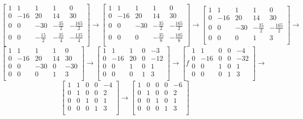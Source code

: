 \documentclass[a4paper]{article}
\begin{document}
\[
\left[
\begin{array}{cccc|c}
	1 & 1 & 1 & 1 & 0 \\ 
	0 & -16 & 20 & 14 & 30 \\ 
	0 & 0 & -30 & -\frac{35}{2} & -\frac{165}{2} \\		
	0 & 0 & -\frac{15}{2} & -\frac{35}{4} & -\frac{135}{4} \\	
\end{array}
\right]
\to
\left[
\begin{array}{cccc|c}
	1 & 1 & 1 & 1 & 0 \\ 
	0 & -16 & 20 & 14 & 30 \\ 
	0 & 0 & -30 & -\frac{35}{2} & -\frac{165}{2} \\		
	0 & 0 & 0 & -\frac{35}{8} & -\frac{105}{8} \\		
\end{array}
\right]
\to
\left[
\begin{array}{cccc|c}
	1 & 1 & 1 & 1 & 0 \\ 
	0 & -16 & 20 & 14 & 30 \\ 
	0 & 0 & -30 & -\frac{35}{2} & -\frac{165}{2} \\		
	0 & 0 & 0 & 1 & 3 \\		
\end{array}
\right]
\to\]
\[
\left[
\begin{array}{cccc|c}
	1 & 1 & 1 & 1 & 0 \\ 
	0 & -16 & 20 & 14 & 30 \\ 
	0 & 0 & -30 & 0 & -30 \\		
	0 & 0 & 0 & 1 & 3 \\			
\end{array}
\right]
\to
\left[
\begin{array}{cccc|c}
	1 & 1 & 1 & 0 & -3 \\ 
	0 & -16 & 20 & 0 & -12 \\ 
	0 & 0 & 1 & 0 & 1 \\		
	0 & 0 & 0 & 1 & 3 \\			
\end{array}
\right]
\to
\left[f
\begin{array}{cccc|c}
	1 & 1 & 0 & 0 & -4 \\ 
	0 & -16 & 0 & 0 & -32 \\ 
	0 & 0 & 1 & 0 & 1 \\		
	0 & 0 & 0 & 1 & 3 \\		
\end{array}
\right]
\to\]
\[
\left[
\begin{array}{cccc|c}
	1 & 1 & 0 & 0 & -4 \\ 
	0 & 1 & 0 & 0 & 2 \\ 
	0 & 0 & 1 & 0 & 1 \\		
	0 & 0 & 0 & 1 & 3 \\		
\end{array}
\right]
\to
\left[
\begin{array}{cccc|c}
	1 & 0 & 0 & 0 & -6 \\ 
	0 & 1 & 0 & 0 & 2 \\ 
	0 & 0 & 1 & 0 & 1 \\		
	0 & 0 & 0 & 1 & 3 \\			
\end{array}
\right]
\]
\end{document}
